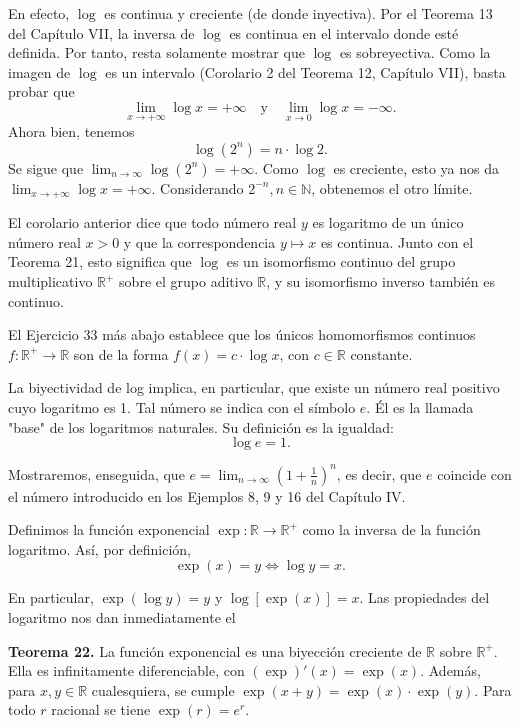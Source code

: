 \documentclass[12pt,oneside]{book}
\begin{document}
En efecto, \( \log \) es continua y creciente (de donde inyectiva). Por el Teorema 13 del Capítulo VII, la inversa de \( \log \) es continua en el intervalo donde esté definida. Por tanto, resta solamente mostrar que \( \log \) es sobreyectiva. Como la imagen de \( \log \) es un intervalo (Corolario 2 del Teorema 12, Capítulo VII), basta probar que
\[
\lim_{x \to +\infty} \log x = +\infty
\quad \text{y} \quad
\lim_{x \to 0} \log x = -\infty.
\]
Ahora bien, tenemos
\[
\log(2^n) = n \cdot \log 2.
\]
Se sigue que \( \lim_{n \to \infty} \log(2^n) = +\infty \). Como \( \log \) es creciente, esto ya nos da \( \lim_{x \to +\infty} \log x = +\infty \). Considerando \( 2^{-n}, n \in \mathbb{N} \), obtenemos el otro límite.

El corolario anterior dice que todo número real \( y \) es logaritmo de un único número real \( x > 0 \) y que la correspondencia \( y \mapsto x \) es continua. Junto con el Teorema 21, esto significa que \( \log \) es un isomorfismo continuo del grupo multiplicativo \(\mathbb{R}^+\) sobre el grupo aditivo \(\mathbb{R}\), y su isomorfismo inverso también es continuo.

El Ejercicio 33 más abajo establece que los únicos homomorfismos continuos \(f: \mathbb{R}^+ \to \mathbb{R}\) son de la forma \(f(x) = c \cdot \log x\), con \(c \in \mathbb{R}\) constante.

La biyectividad de log implica, en particular, que existe un número real positivo cuyo logaritmo es 1. Tal número se indica con el símbolo \(e\). Él es la llamada "base" de los logaritmos naturales. Su definición es la igualdad:
\[
\log e = 1.
\]

Mostraremos, enseguida, que \(e = \lim_{n \to \infty} \left(1 + \frac{1}{n}\right)^n\), es decir, que \(e\) coincide con el número introducido en los Ejemplos 8, 9 y 16 del Capítulo IV.

Definimos la función exponencial \(\exp: \mathbb{R} \to \mathbb{R}^+\) como la inversa de la función logaritmo. Así, por definición,
\[
\exp(x) = y \iff \log y = x.
\]

En particular, \(\exp(\log y) = y\) y \(\log[\exp(x)] = x\). Las propiedades del logaritmo nos dan inmediatamente el

\textbf{Teorema 22.} La función exponencial es una biyección creciente de \(\mathbb{R}\) sobre \(\mathbb{R}^+\). Ella es infinitamente diferenciable, con \((\exp)'(x) = \exp(x)\). Además, para \(x, y \in \mathbb{R}\) cualesquiera, se cumple \(\exp(x + y) = \exp(x) \cdot \exp(y)\). Para todo \(r\) racional se tiene \(\exp(r) = e^r\).
\end{document}
